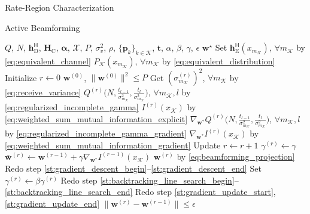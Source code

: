 \documentclass[journal,12pt,onecolumn,draftclsnofoot]{IEEEtran}
\makeatletter
\theoremstyle{remark}
\newcommand\setalgorithmcaptionfont[1]{%
	\let\my@floatc@ruled\floatc@ruled          %
	\def\floatc@ruled{%
		\global\let\floatc@ruled\my@floatc@ruled %
		#1\floatc@ruled}}
\makeatother
\begin{document}
\begin{section}{Rate-Region Characterization}
\begin{subsection}{Active Beamforming}
		\setalgorithmcaptionfont{\small}
		\begin{algorithm}[!t]
			\small
			\caption{Iterative Active Beamforming Optimization by \gls{pgd} with \gls{bls}}
			\label{al:active_beamforming}
			\begin{algorithmic}[1]
				\Require $Q$, $N$, $\boldsymbol{h}_{\text{D}}^\mathsf{H}$, $\boldsymbol{H}_{\text{C}}$, $\boldsymbol{\alpha}$, $\mathcal{X}$, $P$, $\sigma_v^2$, $\rho$, $\{\boldsymbol{p}_k\}_{k \in \mathcal{K}}$, $\boldsymbol{t}$, $\alpha$, $\beta$, $\gamma$, $\epsilon$
				\Ensure $\boldsymbol{w}^\star$
				\State Set $\boldsymbol{h}_{\text{E}}^\mathsf{H}(x_{m_{\mathcal{K}}})$, $\forall m_{\mathcal{K}}$ by \eqref{eq:equivalent_channel}
				\State \phantom{Set} $P_{\mathcal{K}}(x_{m_{\mathcal{K}}})$, $\forall m_{\mathcal{K}}$ by \eqref{eq:equivalent_distribution}
				\State Initialize $r \gets 0$
				\State \phantom{Initialize} $\boldsymbol{w}^{(0)}$, $\lVert\boldsymbol{w}^{(0)}\rVert^2 \le P$
				\State Get $(\sigma_{m_{\mathcal{K}}}^{(r)})^2$, $\forall m_{\mathcal{K}}$ by \eqref{eq:receive_variance} \label{st:gradient_descent_begin}
				\State \phantom{Get} $Q^{(r)}\bigl(N,\frac{t_{l-1}}{\sigma_{m_{\mathcal{K}}}^2},\frac{t_l}{\sigma_{m_{\mathcal{K}}}^2}\bigr)$, $\forall m_{\mathcal{K}},l$ by \eqref{eq:regularized_incomplete_gamma}
				\State \phantom{Get} $I^{(r)}(x_{\mathcal{K}})$ by \eqref{eq:weighted_sum_mutual_information_explicit} \label{st:gradient_descent_end}
				\State \phantom{Get} $\nabla_{\boldsymbol{w}^*} Q^{(r)}\bigl(N,\frac{t_{l-1}}{\sigma_{m_{\mathcal{K}}}^2},\frac{t_l}{\sigma_{m_{\mathcal{K}}}^2}\bigr)$, $\forall m_{\mathcal{K}},l$ by \eqref{eq:regularized_incomplete_gamma_gradient} \label{st:gradient_update_start}
				\State \phantom{Get} $\nabla_{\boldsymbol{w}^*} I^{(r)}(x_{\mathcal{K}})$ by \eqref{eq:weighted_sum_mutual_information_gradient} \label{st:gradient_update_end}
				\Repeat
					\State Update $r \gets r+1$
					\State \phantom{Update} $\gamma^{(r)}\gets\gamma$
					\State \phantom{Update} $\bar{\boldsymbol{w}}^{(r)} \gets \boldsymbol{w}^{(r-1)}+\gamma\nabla_{\boldsymbol{w}^*} I^{(r-1)}(x_{\mathcal{K}})$ \label{st:backtracking_line_search_begin}
					\State \phantom{Update} $\boldsymbol{w}^{(r)}$ by \eqref{eq:beamforming_projection}
					\State Redo step \ref{st:gradient_descent_begin}--\ref{st:gradient_descent_end} \label{st:backtracking_line_search_end}
						\State Set $\gamma^{(r)}\gets\beta\gamma^{(r)}$
						\State Redo step \ref{st:backtracking_line_search_begin}--\ref{st:backtracking_line_search_end}
					\EndWhile
					\State Redo step \ref{st:gradient_update_start}, \ref{st:gradient_update_end}
				\Until $\lVert\boldsymbol{w}^{(r)}-\boldsymbol{w}^{(r-1)}\rVert \le \epsilon$
			\end{algorithmic}
		\end{algorithm}
	\end{subsection}


\end{section}
\end{document}
